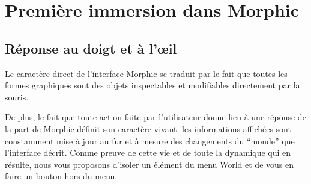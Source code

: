 \documentclass[a4paper,10pt,twoside]{book}
\begin{document}
\section{Premi\`ere immersion dans Morphic}

\subsection{R\'eponse au doigt et \`a l'\oe il}
Le caract\`ere direct de l'interface Morphic se traduit par le fait
que toutes les formes graphiques sont des objets 
inspectables et modifiables directement par la souris.

De plus, le fait que toute action faite par l'utilisateur donne lieu
\`a une r\'eponse de la part de Morphic d\'efinit son caract\`ere
vivant: les informations affich\'ees sont constamment mise \`a jour
au fur et \`a mesure des changements du ``monde'' que l'interface
d\'ecrit. 
Comme preuve de cette vie et de toute la dynamique qui en r\'esulte,
nous vous proposons d'isoler un \'el\'ement du menu World et de vous
en faire un bouton hors du menu.

\end{document}
